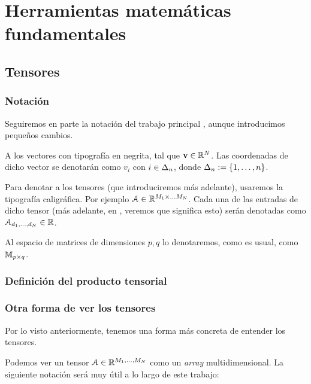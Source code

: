 \chapter{Herramientas matemáticas fundamentales}

\section{Tensores}

\subsection{Notación}

Seguiremos en parte la notación del trabajo principal \cite{matematicas:principal}, aunque introducimos pequeños cambios.

A los vectores con tipografía en negrita, tal que $\mathbf{v} \in \mathbb{R}^N$. Las coordenadas de dicho vector se denotarán como $v_i$ con $i \in \Delta_{n}$, donde $\Delta_{n} := \{1, \ldots, n\}$.

Para denotar a los tensores (que introduciremos más adelante), usaremos la tipografía caligráfica. Por ejemplo $\mathcal{A} \in \mathbb{R}^{M_1 \times \ldots M_N}$. Cada una de las entradas de dicho tensor (más adelante, en , veremos que significa esto) serán denotadas como $\mathcal{A}_{d_1, \ldots, d_N} \in \mathbb{R}$.

Al espacio de matrices de dimensiones $p, q$ lo denotaremos, como es usual, como $\mathbb{M}_{p \times q}$.

\subsection{Definición del producto tensorial} \label{sec:deftensor}

\subsection{Otra forma de ver los tensores}

Por lo visto anteriormente, tenemos una forma más concreta de entender los tensores.

Podemos ver un tensor $\mathcal{A} \in \mathbb{R}^{M_1, \ldots, M_N}$ como un \textit{array} multidimensional. La siguiente notación será muy útil a lo largo de este trabajo:

